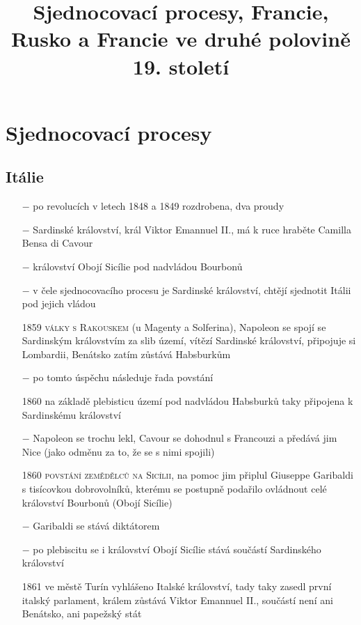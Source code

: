 \documentclass{article}
\title{\vspace{-2cm}Sjednocovací procesy, Francie, Rusko a Francie ve druhé polovině 19. století\vspace{-1.7cm}}
\date{}
\author{}
\begin{document}
\maketitle

\section*{Sjednocovací procesy}

\subsection*{Itálie}

\begin{itemize}
    \vspace{-0.5em}
    \setlength\itemsep{0.15em}
    \item[$-$] po revolucích v letech 1848 a 1849 rozdrobena, dva proudy
    \item[$-$] Sardinské království, král Viktor Emannuel II., má k ruce hraběte Camilla Bensa di Cavour
    \item[$-$] království Obojí Sicílie pod nadvládou Bourbonů
    \item[$-$]  v čele sjednocovacího procesu je Sardinské království, chtějí sjednotit Itálii pod jejich vládou
    \item[1859] \textsc{války s Rakouskem} (u Magenty a Solferina), Napoleon se spojí se Sardinským královstvím za slib území, vítězí Sardinské království, připojuje si Lombardii, Benátsko zatím zůstává Habsburkům
    \item[$-$] po tomto úspěchu následuje řada povstání
    \item[1860] na základě plebisticu území pod nadvládou Habsburků taky připojena k Sardinskému království
    \item[$-$] Napoleon se trochu lekl, Cavour se dohodnul s Francouzi a předává jim Nice (jako odměnu za to, že se s nimi spojili)
    \item[1860] \textsc{povstání zemědělců na Sicílii}, na pomoc jim připlul Giuseppe Garibaldi s tisícovkou dobrovolníků, kterému se postupně podařilo ovládnout celé království Bourbonů (Obojí Sicílie)
    \item[$-$] Garibaldi se stává diktátorem
    \item[$-$] po plebiscitu se i království Obojí Sicílie stává součástí Sardinského království
    \item[1861] ve městě Turín vyhlášeno Italské království, tady taky zasedl první italský parlament, králem zůstává Viktor Emannuel II., součástí není ani Benátsko, ani papežský stát

\end{itemize}
\end{document}
